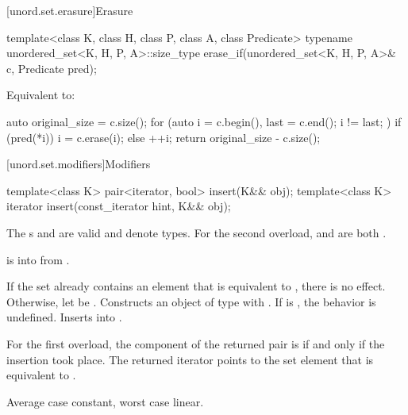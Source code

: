 [unord.set.erasure]{Erasure}

%
\begin{itemdecl}
template<class K, class H, class P, class A, class Predicate>
  typename unordered_set<K, H, P, A>::size_type
    erase_if(unordered_set<K, H, P, A>& c, Predicate pred);
\end{itemdecl}

\begin{itemdescr}
\pnum
\effects
Equivalent to:
\begin{codeblock}
auto original_size = c.size();
for (auto i = c.begin(), last = c.end(); i != last; ) {
  if (pred(*i)) {
    i = c.erase(i);
  } else {
    ++i;
  }
}
return original_size - c.size();
\end{codeblock}
\end{itemdescr}

[unord.set.modifiers]{Modifiers}

%
\begin{itemdecl}
template<class K> pair<iterator, bool> insert(K&& obj);
template<class K> iterator insert(const_iterator hint, K&& obj);
\end{itemdecl}

\begin{itemdescr}
\pnum
\constraints
The s  and
 are valid and denote types.
For the second overload,
 and
 are both .

\pnum
\expects
{} is 
into  from .

\pnum
\effects
If the set already contains an element that is equivalent to ,
there is no effect.
Otherwise, let  be .
Constructs an object  of type 
with .
If  is ,
the behavior is undefined.
Inserts  into .

\pnum
\returns
For the first overload,
the  component of the returned pair is 
if and only if the insertion took place.
The returned iterator points to the set element
that is equivalent to .

\pnum
\complexity
Average case constant, worst case linear.
\end{itemdescr}

